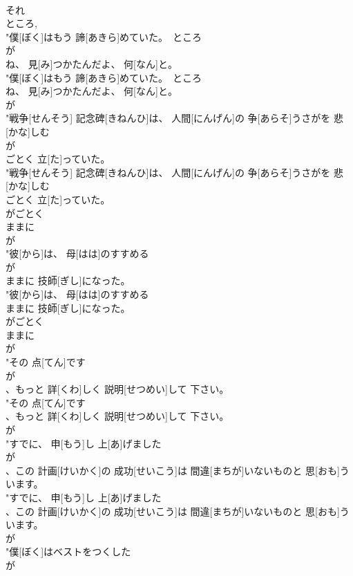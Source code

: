 \documentclass[8pt]{extreport}
\begin{document}
\begin{CJK}{UTF8}{min}
\\	それ 
\\	ところ, 
\\	"僕[ぼく]はもう 諦[あきら]めていた。　ところ
\\	が
\\	ね、 見[み]つかたんだよ、 何[なん]と。
\\	"僕[ぼく]はもう 諦[あきら]めていた。　ところ
\\	ね、 見[み]つかたんだよ、 何[なん]と。
\\	が
\\	"戦争[せんそう] 記念碑[きねんひ]は、 人間[にんげん]の 争[あらそ]うさがを 悲[かな]しむ
\\	が
\\	ごとく 立[た]っていた。
\\	"戦争[せんそう] 記念碑[きねんひ]は、 人間[にんげん]の 争[あらそ]うさがを 悲[かな]しむ
\\	ごとく 立[た]っていた。
\\	がごとく 
\\	ままに 
\\	が
\\	"彼[から]は、 母[はは]のすすめる
\\	が
\\	ままに 技師[ぎし]になった。
\\	"彼[から]は、 母[はは]のすすめる
\\	ままに 技師[ぎし]になった。
\\	がごとく 
\\	ままに 
\\	が
\\	"その 点[てん]です
\\	が
\\	、もっと 詳[くわ]しく 説明[せつめい]して 下さい。
\\	"その 点[てん]です
\\	、もっと 詳[くわ]しく 説明[せつめい]して 下さい。
\\	が
\\	"すでに、 申[もう]し 上[あ]げました
\\	が
\\	、この 計画[けいかく]の 成功[せいこう]は 間違[まちが]いないものと 思[おも]ういます。
\\	"すでに、 申[もう]し 上[あ]げました
\\	、この 計画[けいかく]の 成功[せいこう]は 間違[まちが]いないものと 思[おも]ういます。
\\	が
\\	"僕[ぼく]はベストをつくした
\\	が

\end{CJK}
\end{document}

